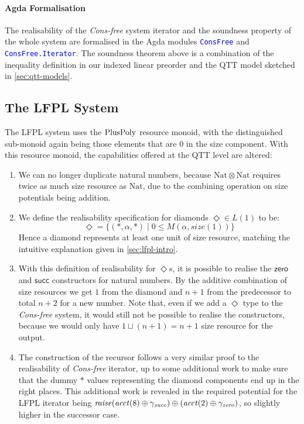 \documentclass[acmsmall,review,screen,anonymous]{acmart}
\newcommand{\tyNat}{\mathrm{Nat}}
\newcommand{\conZero}{\mathsf{zero}}
\newcommand{\conSucc}{\mathsf{succ}}
\newcommand{\AgdaModule}[1]{\textcolor{blue}{\tt #1}}
\begin{document}
\paragraph{Agda Formalisation} The realisability of the
\emph{Cons-free} system iterator and the soundness property of the
whole system are formalised in the Agda modules \AgdaModule{ConsFree}
and \AgdaModule{ConsFree.Iterator}. The soundness theorem above is a
combination of the inequality definition in our indexed linear
preorder and the QTT model sketched in \autoref{sec:qtt-models}.

\subsection{The LFPL System}
\label{sec:lfpl-sound}

The LFPL system uses the $\mathrm{PlusPoly}$ resource monoid, with the
distinguished sub-monoid again being those elements that are $0$ in
the size component. With this resource monoid, the capabilities
offered at the QTT level are altered:
\begin{enumerate}
\item We can no longer duplicate natural numbers, because
  $\tyNat \otimes \tyNat$ requires twice as much size resource as
  $\tyNat$, due to the combining operation on size potentials being
  addition.
\item We define the realisability specification for diamonds
  $\Diamond \in L(1)$ to be:
  \begin{displaymath}
    \Diamond = \{ (*, \alpha, *) \mid 0 \leq M(\alpha, \mathit{size}(1)) \}
  \end{displaymath}
  Hence a diamond represents at least one unit of size resource,
  matching the intuitive explanation given in
  \autoref{sec:lfpl-intro}.
\item With this definition of realisability for $\Diamond$s, it is
  possible to realise the $\conZero$ and $\conSucc$ constructors for
  natural numbers. By the additive combination of size resources we
  get $1$ from the diamond and $n+1$ from the predecessor to total
  $n+2$ for a new number. Note that, even if we add a $\Diamond$ type
  to the \emph{Cons-free} system, it would still not be possible to
  realise the constructors, because we would only have
  $1 \sqcup (n+1) = n+1$ size resource for the output.
\item The construction of the recursor follows a very similar proof to
  the realisability of \emph{Cons-free} iterator, up to some
  additional work to make sure that the dummy $*$ values representing
  the diamond components end up in the right places. This additional
  work is revealed in the required potential for the LFPL iterator
  being
  $\mathit{raise}(\mathit{acct}(8) \oplus \gamma_{\mathit{succ}})
  \oplus (\mathit{acct}(2) \oplus \gamma_{\mathit{zero}})$, so
  slightly higher in the successor case.
\end{enumerate}
\end{document}
